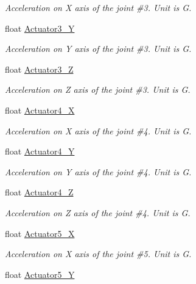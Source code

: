\begin{DoxyCompactItemize}
\begin{DoxyCompactList}\small\item\em Acceleration on X axis of the joint \#3. Unit is G. \end{DoxyCompactList}\item 
float \hyperlink{structAngularAcceleration_a8b372df5c994266783918e9fc7260cb3}{Actuator3\+\_\+Y}
\begin{DoxyCompactList}\small\item\em Acceleration on Y axis of the joint \#3. Unit is G. \end{DoxyCompactList}\item 
float \hyperlink{structAngularAcceleration_a178c35c220a0d0ecc8e0d228c10dfac0}{Actuator3\+\_\+Z}
\begin{DoxyCompactList}\small\item\em Acceleration on Z axis of the joint \#3. Unit is G. \end{DoxyCompactList}\item 
float \hyperlink{structAngularAcceleration_a5ac59b5d6354f56a574849b3058aff8a}{Actuator4\+\_\+X}
\begin{DoxyCompactList}\small\item\em Acceleration on X axis of the joint \#4. Unit is G. \end{DoxyCompactList}\item 
float \hyperlink{structAngularAcceleration_ab19b628ee0ba917a65b5f0ccb4c663c0}{Actuator4\+\_\+Y}
\begin{DoxyCompactList}\small\item\em Acceleration on Y axis of the joint \#4. Unit is G. \end{DoxyCompactList}\item 
float \hyperlink{structAngularAcceleration_a4407b12848019a178128df8cd3f7a371}{Actuator4\+\_\+Z}
\begin{DoxyCompactList}\small\item\em Acceleration on Z axis of the joint \#4. Unit is G. \end{DoxyCompactList}\item 
float \hyperlink{structAngularAcceleration_a7ae66f2e31c5e90fe07b234e474ead12}{Actuator5\+\_\+X}
\begin{DoxyCompactList}\small\item\em Acceleration on X axis of the joint \#5. Unit is G. \end{DoxyCompactList}\item 
float \hyperlink{structAngularAcceleration_a44a285d25040047b089f3d977a82546a}{Actuator5\+\_\+Y}

\end{DoxyCompactItemize}
